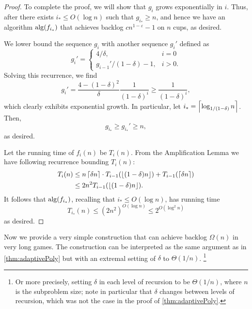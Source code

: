 \begin{proof}
  To complete the proof, we will show that $g_i$ grows exponentially in $i$. Thus,
  after there exists $i_* \le O(\log n)$ such that
  $g_{i_*} \ge n$, and hence we have an algorithm $\operatorname{\text{\textup{alg}}}(f_{i_*})$
  that achieves backlog $cn^{1-\varepsilon}-1$ on $n$ cups, as
  desired.
  
  We lower bound the sequence $g_i$ with another sequence $g_i'$
  defined as 
  $$g_i'=\begin{cases}
    4/\delta, & i=0\\
    g_{i-1}' / (1-\delta) -1, & i> 0.
  \end{cases}$$
  Solving this recurrence, we find 
  $$g_i' = \frac{4-(1-\delta)^2}{\delta} \frac{1}{(1-\delta)^i}
  \ge \frac{1}{(1-\delta)^i},$$
  which clearly exhibits exponential growth. 
  In particular, let $i_* = \left\lceil \log_{1/(1-\delta)} n \right\rceil$. Then,
  $$ g_{i_*} \ge g_{i_*}' \ge n,$$ as desired.

  Let the running time of $f_i(n)$ be $T_i(n)$. From the
  Amplification Lemma we have following recurrence bounding
  $T_i(n)$:
  \begin{align*}
    T_i(n) &\le n\left\lceil \delta n \right\rceil \cdot T_{i-1}(\left\lfloor (1-\delta)n \right\rfloor) +
  T_{i-1}(\left\lceil \delta n \right\rceil) \\
  &\le 2n^2T_{i-1}(\left\lfloor (1-\delta)n \right\rfloor).
  \end{align*}
  It follows that $\operatorname{\text{\textup{alg}}}(f_{i_*})$, recalling that $i_* \le O(\log n)$, has running time
  $$T_{i_*}(n) \le (2n^2)^{O(\log n)} \le 2^{O(\log^2 n)}$$
  as desired.

\end{proof}

Now we provide a very simple construction that can achieve backlog $\Omega(n)$
in very long games. The construction can be interpreted as the same
argument as in \cref{thm:adaptivePoly} but with an extremal setting of
$\delta$ to $\Theta(1/n)$. \footnote{Or more precisely, setting
$\delta$ in each level of recursion to be $\Theta(1 / n)$, where
$n$ is the subproblem size; note in particular that $\delta$
changes between levels of recursion, which was not the case in
the proof of \cref{thm:adaptivePoly}.}


